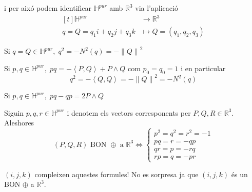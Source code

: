 \documentclass[a4paper,12pt]{article}
\begin{document}
	i per aixó podem identificar $\mathbb{H}^{pur}$ amb $\mathbb{R}^3$ via l'aplicació
	\begin{displaymath}
		\begin{aligned}[t]
			\mathbb{H}^{pur} &\to \mathbb{R}^3\\
			q = Q = q_1i + q_2j + q_3k &\mapsto Q = (q_1, q_2, q_3)
		\end{aligned}
	\end{displaymath}
	\begin{proposicio}
		Si $q = Q \in \mathbb{H}^{pur},\; q^2 = -N^2(q) = -\left\lVert Q \right\rVert^2$
	\end{proposicio}
	\begin{demostracio}
		Si $p, q \in \mathbb{H}^{pur},\; pq = -\left\langle P, Q \right\rangle + P\wedge Q$ com $p_0 = q_0 = 1$ i en particular
		\begin{displaymath}
			q^2 = -\left\langle Q, Q \right\rangle = -\left\lVert Q \right\rVert^2 = - N^2(q)
		\end{displaymath}
	\end{demostracio}
	\begin{obs}
		Si $p,q \in \mathbb{H}^{pur},\; pq-qp = 2 P\wedge Q$
	\end{obs}
	\begin{teorema}
		Siguin $p, q, r \in \mathbb{H}^{pur}$ i denotem els vectors corresponents per $P, Q, R \in \mathbb{R}^3$. Aleshores
		\begin{displaymath}
			(P, Q, R) \text{ BON } \oplus \text{ a } \mathbb{R}^3 \Leftrightarrow \begin{cases}
				p^2 = q^2 = r^2 = -1\\
				pq = r = -qp\\
				qr = p = -rq\\
				rp = q = -pr
				\end{cases}
		\end{displaymath}
	\end{teorema}
	\begin{obs}
		$(i, j, k)$ compleixen aquestes formules! No es sorpresa ja que $(i, j, k)$ és un BON $\oplus$ a $\mathbb{R}^3$.
	\end{obs}
\end{document}
